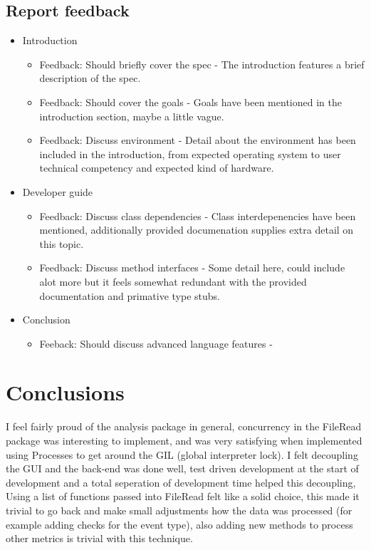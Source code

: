 \documentclass[11pt]{article}
\begin{document}
\subsection{Report feedback}
\begin{itemize}
    \item Introduction
        \begin{itemize}
            \item Feedback: Should briefly cover the spec - The introduction features a brief description of the spec.
            \item Feedback: Should cover the goals - Goals have been mentioned in the introduction section, maybe a little vague.
            \item Feedback: Discuss environment - Detail about the environment has been included in the introduction, from expected operating system to user technical competency and expected kind of hardware.
        \end{itemize}
    \item Developer guide
        \begin{itemize}
            \item Feedback: Discuss class dependencies - Class interdepenencies have been mentioned, additionally provided documenation supplies extra detail on this topic.
            \item Feedback: Discuss method interfaces - Some detail here, could include alot more but it feels somewhat redundant with the provided documentation and primative type stubs.
        \end{itemize}
    \item Conclusion
        \begin{itemize}
            \item Feeback: Should discuss advanced language features - 
        \end{itemize}
\end{itemize}


\section{Conclusions}


I feel fairly proud of the analysis package in general, concurrency in the FileRead package was interesting to implement, and was very satisfying when implemented using Processes to get around the GIL (global interpreter lock). 
I felt decoupling the GUI and the back-end was done well, test driven development at the start of development and a total seperation of development time helped this decoupling, 
Using a list of functions passed into FileRead felt like a solid choice, this made it trivial to go back and make small adjustments how the data was processed (for example adding checks for the event type), also adding new methods to process other metrics is trivial with this technique.
\end{document}
